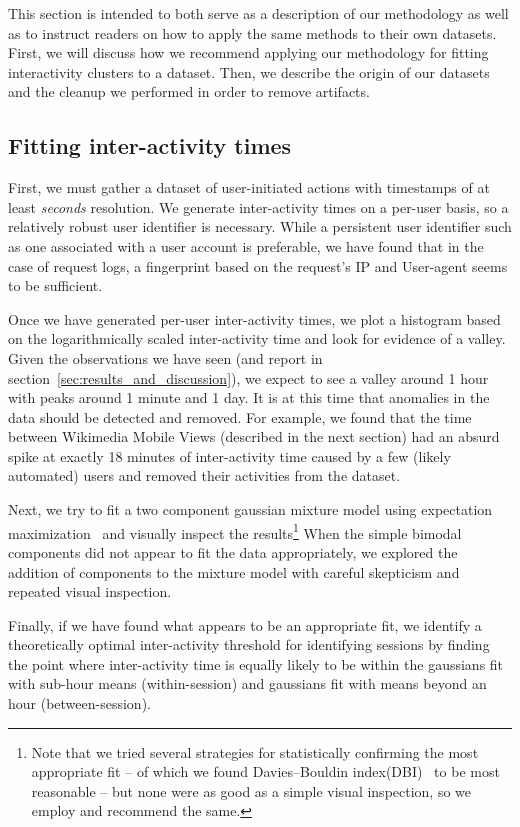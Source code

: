 This section is intended to both serve as a description of our methodology as well as to instruct readers on how to apply the same methods to their own datasets.  First, we will discuss how we recommend applying our methodology for fitting interactivity clusters to a dataset.  Then, we describe the origin of our datasets and the cleanup we performed in order to remove artifacts.

\subsection{Fitting inter-activity times}
First, we must gather a dataset of user-initiated actions with timestamps of at least \emph{seconds} resolution.  We generate inter-activity times on a per-user basis, so a relatively robust user identifier is necessary.  While a persistent user identifier such as one associated with a user account is preferable, we have found that in the case of request logs, a fingerprint based on the request's IP and User-agent seems to be sufficient.

Once we have generated per-user inter-activity times, we plot a histogram based on the logarithmically scaled inter-activity time and look for evidence of a valley.  Given the observations we have seen (and report in section~\ref{sec:results_and_discussion}), we expect to see a valley around 1 hour with peaks around 1 minute and 1 day.  It is at this time that anomalies in the data should be detected and removed.  For example, we found that the time between Wikimedia Mobile Views (described in the next section) had an absurd spike at exactly 18 minutes of inter-activity time caused by a few (likely automated) users and removed their activities from the dataset.

Next, we try to fit a two component gaussian mixture model using expectation maximization~\cite{benaglia2009mixtools} and visually inspect the results\footnote{Note that we tried several strategies for statistically confirming the most appropriate fit -- of which we found Davies--Bouldin index(DBI)~\cite{davies1979cluster} to be most reasonable -- but none were as good as a simple visual inspection, so we employ and recommend the same.}  When the simple bimodal components did not appear to fit the data appropriately, we explored the addition of components to the mixture model with careful skepticism and repeated visual inspection.

Finally, if we have found what appears to be an appropriate fit, we identify a theoretically optimal inter-activity threshold for identifying sessions by finding the point where inter-activity time is equally likely to be within the gaussians fit with sub-hour means (within-session) and gaussians fit with means beyond an hour (between-session).

